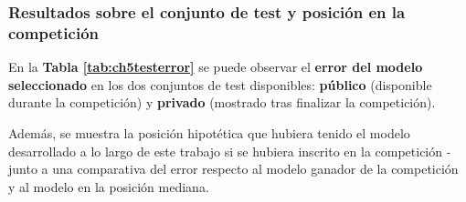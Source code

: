 \subsubsection{Resultados sobre el conjunto de test y posición en la competición}

En la \textbf{Tabla \ref{tab:ch5testerror}} se puede observar el \textbf{error del modelo seleccionado} en los dos conjuntos de test disponibles: \textbf{público} (disponible durante la competición) y \textbf{privado} (mostrado tras finalizar la competición).

Además, se muestra la posición hipotética que hubiera tenido el modelo desarrollado a lo largo de este trabajo si se hubiera inscrito en la competición - junto a una comparativa del error respecto al modelo ganador de la competición y al modelo en la posición mediana.

\begin{table}[h]
	\vspace{-4mm}
	\centering
	\captionsetup{justification=centering}
	\caption{Error del modelo seleccionado en el conjunto de test}
	\label{tab:ch5testerror}
\end{table}

